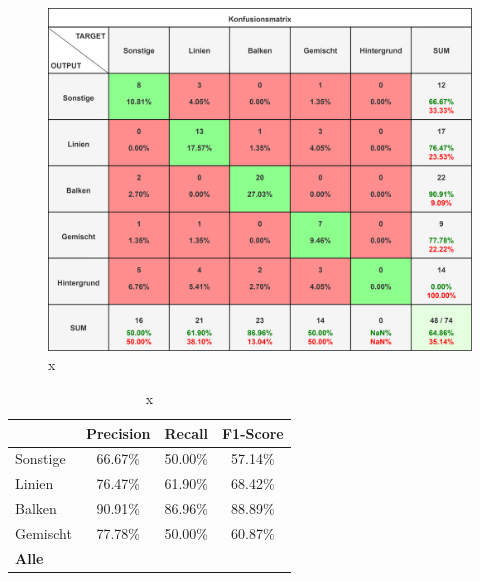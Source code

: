 \begin{figure}[H]
    \centering
    \captionsetup{width=1\linewidth}
    \includegraphics[width=1\textwidth]{Experimente/img/detect/3_val@0.653_nohisto/konfusionsmatrix.png}
    \caption{ x}
    \label{fig:extraction_output}
\end{figure}

\begin{table}[H]
    \centering
    \begin{tabular}{|l|c|c|c|}
        \hline
        \rowcolor[HTML]{EFEFEF}
                      & Precision & Recall    & F1-Score  \\ \hline
        Sonstige      & 66.67\%   & 50.00\%   & 57.14\%   \\ \hline
        Linien        & 76.47\%   & 61.90\%   & 68.42\%   \\ \hline
        Balken        & 90.91\%   & 86.96\%   & 88.89\%   \\ \hline
        Gemischt      & 77.78\%   & 50.00\%   & 60.87\%   \\ \hline
        \textbf{Alle} & \textbf{} & \textbf{} & \textbf{} \\ \hline
    \end{tabular}
    \caption{x}
\end{table}







